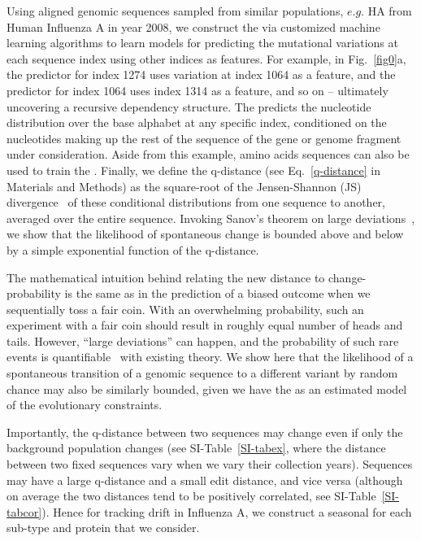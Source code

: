 \documentclass[onecolumn, compsoc,10pt]{IEEEtran}
\begin{document}
Using aligned genomic sequences sampled from  similar populations, $e.g.$ HA from Human Influenza A in year 2008, we construct the \qnet via  customized machine learning algorithms to  learn models for predicting the mutational variations at each sequence index using other indices  as features. For example, in Fig.~\ref{fig0}a,  the predictor for index 1274 uses variation at index 1064 as a feature, and the predictor for index 1064 uses index 1314 as a feature, and so on -- ultimately uncovering a recursive dependency structure. The \qnet predicts the nucleotide distribution over the base alphabet at any specific index, conditioned on the nucleotides making up the rest of the sequence of the gene or genome fragment under consideration. Aside from this example, amino acids sequences can also be used to train the \qnet. Finally, we define the q-distance (see Eq.~\eqref{q-distance} in Materials and Methods) as the square-root of the Jensen-Shannon (JS) divergence~\cite{cover} of these conditional distributions from one sequence to another, averaged over the entire sequence. Invoking Sanov's theorem on large deviations~\cite{cover}, we show  that the  likelihood of spontaneous change is bounded above and below by a simple exponential function of the  q-distance. 

The mathematical intuition behind relating the new distance to change-probability  is the same as in the prediction of  a biased outcome when we sequentially toss a fair coin. With an overwhelming probability, such an experiment with a fair coin should result in roughly equal number of heads and tails. However, ``large deviations'' can happen, and the probability of such rare events is quantifiable~\cite{varadhan2010large} with existing theory. We show here that the likelihood of a spontaneous transition of a genomic sequence to a  different variant by random chance may also be similarly bounded, given we have the \qnet as  an estimated model of the evolutionary constraints.

Importantly, the q-distance  between two sequences may change even if only the background population changes (see SI-Table~\ref{SI-tabex}, where  the distance between two  fixed sequences vary when we vary their collection years). Sequences may have a large q-distance and a small edit distance, and vice versa (although on average the two distances tend to be positively correlated, see SI-Table~\ref{SI-tabcor}).  Hence for tracking drift in Influenza A, we construct a seasonal \qnet for each sub-type and protein that we consider.
\end{document}
